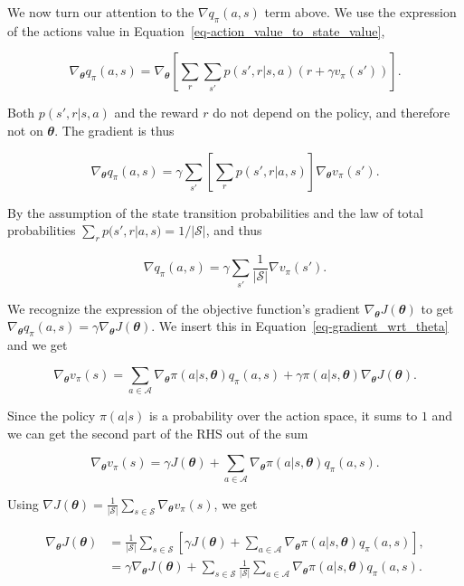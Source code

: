 \documentclass[
  letterpaper,
]{report}
\theoremstyle{plain}
\theoremstyle{definition}
\theoremstyle{definition}
\theoremstyle{remark}
\begin{document}
We now turn our attention to the \(\nabla q_\pi(a,s)\) term above. We
use the expression of the actions value in
Equation~\ref{eq-action_value_to_state_value},

\[
\nabla_{\mathbfit{\theta}} q_\pi(a,s) = \nabla_{\mathbfit{\theta}} \left[ \sum_{r}\sum_{s'} p(s',r|s,a)(r + \gamma v_\pi(s'))\right].
\]

Both \(p(s',r|s,a)\) and the reward \(r\) do not depend on the policy,
and therefore not on \(\mathbfit{\theta}\). The gradient is thus

\[
\nabla_{\mathbfit{\theta}} q_\pi(a,s) =  \gamma\sum_{s'}\left[\sum_{r}p(s',r|a,s)\right]\nabla_{\mathbfit{\theta}} v_\pi(s').
\]

By the assumption of the state transition probabilities and the law of
total probabilities \(\sum_{r}p(s',r|a,s)= 1/|\mathcal{S}|\), and thus

\[
\nabla q_\pi(a,s) =  \gamma\sum_{s'}\frac{1}{|\mathcal{S}|}\nabla v_\pi(s').
\]

We recognize the expression of the objective function's gradient
\(\nabla_{\mathbfit{\theta}} J({\mathbfit{\theta}})\) to get
\(\nabla_{\mathbfit{\theta}} q_\pi(a,s) = \gamma \nabla_{\mathbfit{\theta}} J({\mathbfit{\theta}})\).
We insert this in Equation~\ref{eq-gradient_wrt_theta} and we get

\[
\nabla_{\mathbfit{\theta}} v_\pi(s) = \sum_{a\in\mathcal{A}}\nabla_{\mathbfit{\theta}}\pi(a|s, {\mathbfit{\theta}})q_\pi(a,s) + \gamma\pi(a|s, {\mathbfit{\theta}})\nabla_{\mathbfit{\theta}} J({\mathbfit{\theta}}).
\]

Since the policy \(\pi(a|s)\) is a probability over the action space, it
sums to \(1\) and we can get the second part of the RHS out of the sum

\[
\nabla_{\mathbfit{\theta}} v_\pi(s) = \gamma J({\mathbfit{\theta}}) + \sum_{a\in\mathcal{A}}\nabla_{\mathbfit{\theta}}\pi(a|s,{\mathbfit{\theta}})q_\pi(a,s).
\]

Using
\(\nabla J({\mathbfit{\theta}}) = \frac{1}{|\mathcal{S}|}\sum_{s\in\mathcal{S}}\nabla_{\mathbfit{\theta}} v_\pi(s)\),
we get

\begin{align}
\nabla_{\mathbfit{\theta}} J({\mathbfit{\theta}}) &= \frac{1}{|\mathcal{S}|}\sum_{s\in\mathcal{S}}\left[\gamma J({\mathbfit{\theta}}) + \sum_{a\in\mathcal{A}}\nabla_{\mathbfit{\theta}}\pi(a|s, {\mathbfit{\theta}})q_\pi(a,s)\right],\\
&= \gamma \nabla_{\mathbfit{\theta}} J({\mathbfit{\theta}}) + \sum_{s\in\mathcal{S}}\frac{1}{|\mathcal{S}|}\sum_{a\in\mathcal{A}}\nabla_{\mathbfit{\theta}}\pi(a|s, {\mathbfit{\theta}})q_\pi(a,s).
\end{align}
\end{document}
